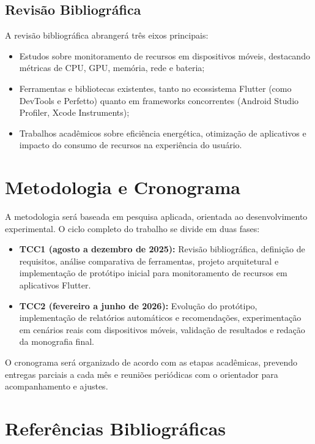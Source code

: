 \documentclass[12pt,a4paper]{article}
\begin{document}
\subsection{Revisão Bibliográfica}
A revisão bibliográfica abrangerá três eixos principais:
\begin{itemize}
    \item Estudos sobre monitoramento de recursos em dispositivos móveis, destacando métricas de CPU, GPU, memória, rede e bateria;
    \item Ferramentas e bibliotecas existentes, tanto no ecossistema Flutter (como DevTools e Perfetto) quanto em frameworks concorrentes (Android Studio Profiler, Xcode Instruments);
    \item Trabalhos acadêmicos sobre eficiência energética, otimização de aplicativos e impacto do consumo de recursos na experiência do usuário.
\end{itemize}

\section{Metodologia e Cronograma}

A metodologia será baseada em pesquisa aplicada, orientada ao desenvolvimento experimental. O ciclo completo do trabalho se divide em duas fases:

\begin{itemize}
    \item \textbf{TCC1 (agosto a dezembro de 2025):}  
    Revisão bibliográfica, definição de requisitos, análise comparativa de ferramentas, projeto arquitetural e implementação de protótipo inicial para monitoramento de recursos em aplicativos Flutter.
    
    \item \textbf{TCC2 (fevereiro a junho de 2026):}  
    Evolução do protótipo, implementação de relatórios automáticos e recomendações, experimentação em cenários reais com dispositivos móveis, validação de resultados e redação da monografia final.
\end{itemize}

O cronograma será organizado de acordo com as etapas acadêmicas, prevendo entregas parciais a cada mês e reuniões periódicas com o orientador para acompanhamento e ajustes.

\section{Referências Bibliográficas}
\end{document}
